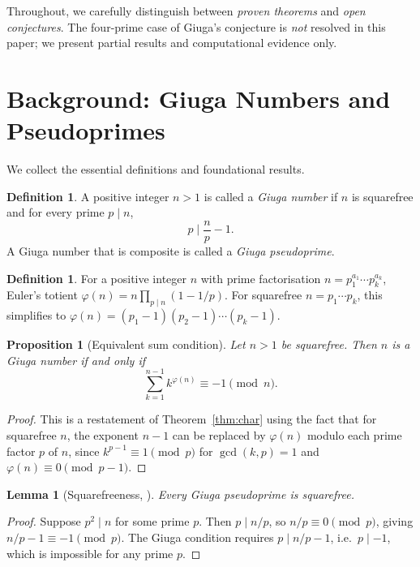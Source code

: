 \documentclass[12pt,a4paper]{amsart}
\newtheorem{lemma}[theorem]{Lemma}
\newtheorem{proposition}[theorem]{Proposition}
\theoremstyle{definition}
\newtheorem{definition}[theorem]{Definition}
\begin{document}
Throughout, we carefully distinguish between \emph{proven theorems} and
\emph{open conjectures}.  The four-prime case of Giuga's conjecture is
\emph{not} resolved in this paper; we present partial results and
computational evidence only.

\section{Background: Giuga Numbers and Pseudoprimes}
\label{sec:background}

We collect the essential definitions and foundational results.

\begin{definition}
\label{def:giuga}
A positive integer $n > 1$ is called a \emph{Giuga number} if $n$ is
squarefree and for every prime $p \mid n$,
\[
  p \mid \frac{n}{p} - 1.
\]
A Giuga number that is composite is called a \emph{Giuga pseudoprime}.
\end{definition}

\begin{definition}
\label{def:phi}
For a positive integer $n$ with prime factorisation $n = p_1^{a_1} \cdots
p_k^{a_k}$, Euler's totient $\varphi(n) = n \prod_{p \mid n}(1 - 1/p)$.
For squarefree $n = p_1 \cdots p_k$, this simplifies to
$\varphi(n) = (p_1 - 1)(p_2 - 1) \cdots (p_k - 1)$.
\end{definition}

\begin{proposition}[Equivalent sum condition]
\label{prop:sum}
Let $n > 1$ be squarefree.  Then $n$ is a Giuga number if and only if
\[
  \sum_{k=1}^{n-1} k^{\varphi(n)} \equiv -1 \pmod{n}.
\]
\end{proposition}

\begin{proof}
This is a restatement of Theorem~\ref{thm:char} using the fact that for
squarefree $n$, the exponent $n-1$ can be replaced by $\varphi(n)$ modulo
each prime factor $p$ of $n$, since $k^{p-1} \equiv 1 \pmod{p}$ for
$\gcd(k,p)=1$ and $\varphi(n) \equiv 0 \pmod{p-1}$.
\end{proof}

\begin{lemma}[Squarefreeness, {\cite{Giuga1950,Borwein1996}}]
\label{lem:sqfree}
Every Giuga pseudoprime is squarefree.
\end{lemma}

\begin{proof}
Suppose $p^2 \mid n$ for some prime $p$.  Then $p \mid n/p$, so
$n/p \equiv 0 \pmod{p}$, giving $n/p - 1 \equiv -1 \pmod{p}$.
The Giuga condition requires $p \mid n/p - 1$, i.e.\ $p \mid {-1}$,
which is impossible for any prime $p$.
\end{proof}
\end{document}
